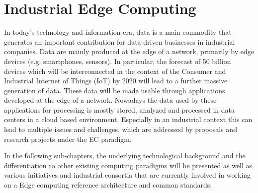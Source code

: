 \section{Industrial Edge Computing}\label{sec:background}
In today's technology and information era, data is a main commodity that generates an important contribution for data-driven businesses in industrial companies. Data are mainly produced at the edge of a network, primarily by edge devices (e.g. smartphones, sensors). In particular, the forecast of 50 billion devices which will be interconnected in the context of the Consumer and Industrial Internet of Things (IoT) by 2020 will lead to a further massive generation of data. These data will be made usable through applications developed at the edge of a network. Nowadays the data used by these applications for processing is mostly stored, analyzed and processed in data centers in a cloud based environment. Especially in an industrial context this can lead to multiple issues and challenges, which are addressed by proposals and research projects under the EC paradigm.\par
In the following sub-chapters, the underlying technological background and the differentiation to other existing computing paradigms will be presented as well as various initiatives and industrial consortia that are currently involved in working on a Edge computing reference architecture and common standards.


